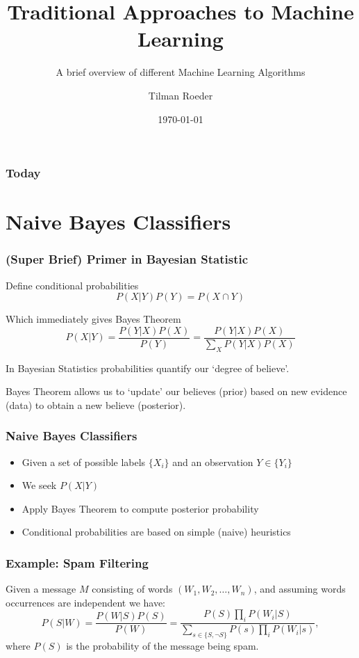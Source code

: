 \documentclass[mathserif,serif]{beamer}
\title{Traditional Approaches to Machine Learning}
\subtitle{A brief overview of different Machine Learning Algorithms}
\author{Tilman Roeder}
\date{\today}
\begin{document}
\begin{frame}
  \maketitle
\end{frame}

\begin{frame}
  \frametitle{Today}
  \tableofcontents
\end{frame}

\section{Naive Bayes Classifiers}
\frame{\sectionpage}

\begin{frame}
  \frametitle{(Super Brief) Primer in Bayesian Statistic}

  Define conditional probabilities
  \begin{equation}
    P(X|Y) P(Y) = P(X \cap Y)
  \end{equation}
  \pause

  Which immediately gives Bayes Theorem
  \begin{equation}
    P(X|Y) = \frac{P(Y|X) P(X)}{P(Y)} = \frac{P(Y|X) P(X)}{\sum_X P(Y|X) P(X)}
  \end{equation}
  \pause

  In Bayesian Statistics probabilities quantify our `degree of believe'.

  Bayes Theorem allows us to `update' our believes (prior) based on new
  evidence (data) to obtain a new believe (posterior).
\end{frame}

\begin{frame}
  \frametitle{Naive Bayes Classifiers}
  \begin{itemize}
    \item<1-> Given a set of possible labels $\{X_i\}$ and an observation $Y \in \{Y_i\}$
    \item<2-> We seek $P(X|Y)$
    \item<3-> Apply Bayes Theorem to compute posterior probability
    \item<4-> Conditional probabilities are based on simple (naive) heuristics
  \end{itemize}
\end{frame}

\begin{frame}
  \frametitle{Example: Spam Filtering}
  Given a message $M$ consisting of words $(W_1, W_2, \dots, W_n)$, and assuming words occurrences
  are independent we have:
  \begin{equation}
    P(S|W) = \frac{P(W|S)P(S)}{P(W)} = \frac{P(S)\prod_i P(W_i|S)}{\sum_{s \in \{S, \neg S\}} P(s) \prod_i P(W_i|s)},
  \end{equation}
  where $P(S)$ is the probability of the message being spam.
\end{frame}
\end{document}
